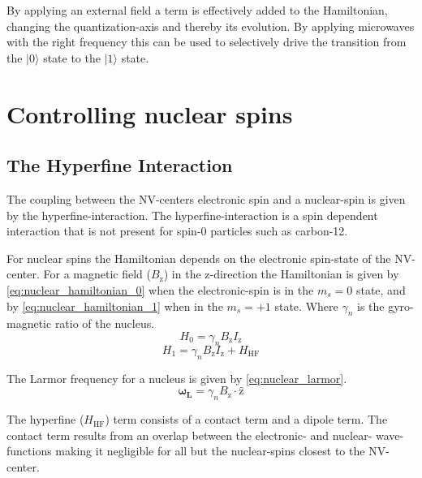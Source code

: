 By applying an external field a term is effectively added to the Hamiltonian, changing the quantization-axis and thereby its evolution. By applying microwaves with the right frequency this can be used to selectively drive the transition from the  $|0\rangle$ state to the $|1\rangle$ state\citep{Jelezko2004Observation}.


\section{Controlling nuclear spins}


\subsection{The Hyperfine Interaction}
The coupling between the NV-centers electronic spin and a nuclear-spin is given by the hyperfine-interaction. The hyperfine-interaction is a spin dependent interaction that is not present for spin-0 particles such as carbon-12.

For nuclear spins the Hamiltonian depends on the electronic spin-state of the NV-center.
For a magnetic field ($B_\mathrm{z}$) in the z-direction the Hamiltonian is given by \cref{eq:nuclear_hamiltonian_0} when the electronic-spin is in the $m_s = 0$ state, and by \cref{eq:nuclear_hamiltonian_1} when in the $m_s = +1$ state\citep{Taminiau2014Universal}. Where $\gamma_n$ is the gyro-magnetic ratio of the nucleus.
 \begin{equation}
 \label{eq:nuclear_hamiltonian_0}
H_0= \gamma_{n} B_\mathrm{z} I_\mathrm{z}
\end{equation}
\begin{equation}
 \label{eq:nuclear_hamiltonian_1}
    H_1 = \gamma_{n} B_\mathrm{z} I_\mathrm{z} +H_{\mathrm{HF}}
\end{equation}

The Larmor frequency for a nucleus is given by  \cref{eq:nuclear_larmor}.
\begin{equation}
\label{eq:nuclear_larmor}
\bm{\omega_L} = \gamma_{n}B_\mathrm{z} \cdot\bm{\hat{\mathrm{z}}}
\end{equation}

The hyperfine ($H_{\mathrm{HF}}$) term consists of a contact term and a dipole term.
The contact term results from an overlap between the electronic- and nuclear- wave-functions making it negligible for all but the nuclear-spins closest to the NV-center.

